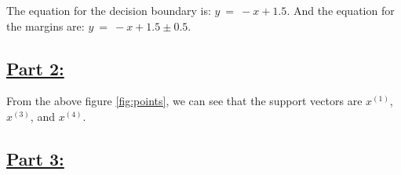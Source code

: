 \documentclass[20pt]{article}
\begin{document}
The equation for the decision boundary is: $y\ =\ -x+1.5$. And the equation for the margins are: $y\ =\ -x+1.5 \pm0.5$.

\subsection*{\underline{Part 2:}}

From the above figure \ref{fig:points}, we can see that the support vectors are $x^{(1)}$, $x^{(3)}$, and $x^{(4)}$.

\subsection*{\underline{Part 3:}}
\end{document}
